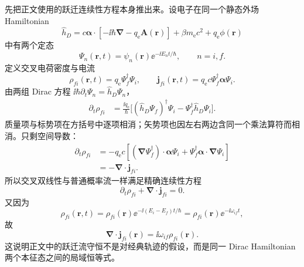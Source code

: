 \begin{derivation}
先把正文使用的跃迁连续性方程本身推出来。设电子在同一个静态外场 Hamiltonian
\begin{equation*}
\hat h_D
=c\boldsymbol\alpha\cdot[-\ii\hbar\boldsymbol\nabla-q_{\mathrm e}\mathbf A(\mathbf r)]
+\beta m_{\mathrm e} c^2+q_{\mathrm e}\phi(\mathbf r)
\end{equation*}
中有两个定态
\begin{equation*}
\Psi_n(\mathbf r,t)=\psi_n(\mathbf r)\ee^{-\ii E_nt/\hbar},
\qquad n=i,f.
\end{equation*}
定义交叉电荷密度与电流
\begin{equation*}
\rho_{fi}(\mathbf r,t)
=q_{\mathrm e}\Psi_f^\dagger\Psi_i,
\qquad
\mathbf j_{fi}(\mathbf r,t)
=q_{\mathrm e} c\Psi_f^\dagger\boldsymbol\alpha\Psi_i.
\end{equation*}
由两组 Dirac 方程
$\ii\hbar\partial_t\Psi_n=\hat h_D\Psi_n$，
\begin{align*}
\partial_t\rho_{fi}
&=\frac{\ii q_{\mathrm e}}{\hbar}
\bigl[(\hat h_D\Psi_f)^\dagger\Psi_i
-\Psi_f^\dagger\hat h_D\Psi_i\bigr].
\end{align*}
质量项与标势项在方括号中逐项相消；矢势项也因左右两边含同一个乘法算符而相消。只剩空间导数：
\begin{align*}
\partial_t\rho_{fi}
&=-q_{\mathrm e} c\left[
(\boldsymbol\nabla\Psi_f^\dagger)\cdot\boldsymbol\alpha\Psi_i
+\Psi_f^\dagger\boldsymbol\alpha\cdot\boldsymbol\nabla\Psi_i
\right]\\
&=-\boldsymbol\nabla\cdot\mathbf j_{fi}.
\end{align*}
所以交叉双线性与普通概率流一样满足精确连续性方程
\begin{equation*}
\partial_t\rho_{fi}+\boldsymbol\nabla\cdot\mathbf j_{fi}=0.
\end{equation*}
又因为
\begin{equation*}
\rho_{fi}(\mathbf r,t)
=\rho_{fi}(\mathbf r)\ee^{-\ii(E_i-E_f)t/\hbar}
=\rho_{fi}(\mathbf r)\ee^{-\ii\omega_{if}t},
\end{equation*}
故
\begin{equation*}
\boxed{
\boldsymbol\nabla\cdot\mathbf j_{fi}(\mathbf r)
=\ii\omega_{if}\rho_{fi}(\mathbf r)}.
\end{equation*}
这说明正文中的跃迁流守恒不是对经典轨迹的假设，而是同一 Dirac Hamiltonian 两个本征态之间的局域恒等式。


\end{derivation}

